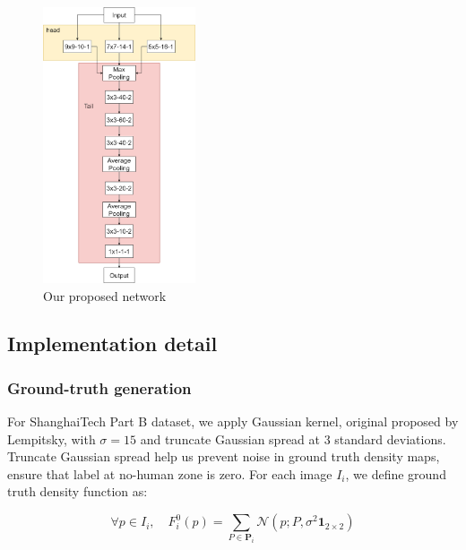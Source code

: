 

\begin{figure}[htbp]
\centerline{\includegraphics[width=0.4\textwidth]{Picture/proposed/tail13_fix2.png}}
\caption{Our proposed network}
\label{fig:dccnn}
\end{figure}



\subsection{Implementation detail}

\subsubsection{Ground-truth generation} \hfill

For ShanghaiTech Part B dataset, we apply Gaussian kernel, original proposed by Lempitsky, \cite{lempitsky2010learning} with $\sigma = 15$ and truncate Gaussian spread at 3 standard deviations. Truncate Gaussian spread help us prevent noise in ground truth density maps, ensure that label at no-human zone is zero. For each image $I_i$, we define ground truth density function as: 

\begin{equation} \label{eq:densit-function}
\forall p \in I_{i}, \quad F_{i}^{0}(p)=\sum_{P \in \mathbf{P}_{i}} \mathcal{N}\left(p ; P, \sigma^{2} \mathbf{1}_{2 \times 2}\right) 
\end{equation}

